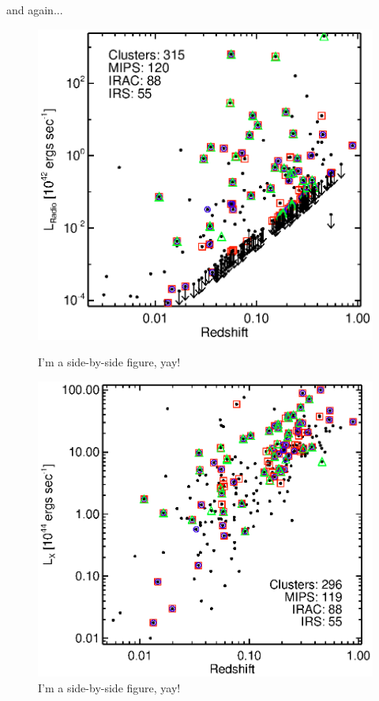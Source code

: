 \documentclass[letterpaper,11pt,onecolumn]{article}
\begin{document}
and again...

\begin{figure}[ht]
    \begin{minipage}[b]{0.5\linewidth}
        \centering
        \includegraphics*[scale=0.75, trim=30mm 15mm 30mm 15mm, clip]{spitzer_lrad}
        \caption{I'm a side-by-side figure, yay!}
        \label{fig:figure1}
    \end{minipage}
    \hspace{0cm}
    \begin{minipage}[b]{0.5\linewidth}
        \centering
        \includegraphics*[scale=0.75, trim=30mm 15mm 30mm 15mm, clip]{spitzer_lx}
        \caption{I'm a side-by-side figure, yay!}
        \label{fig:figure2}
    \end{minipage}
\end{figure}
\end{document}
